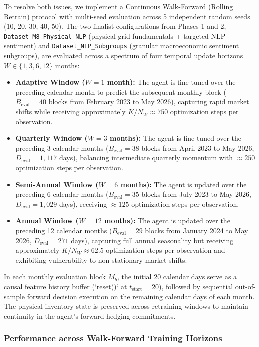To resolve both issues, we implement a Continuous Walk-Forward (Rolling Retrain) protocol with multi-seed evaluation across 5 independent random seeds (10, 20, 30, 40, 50). The two finalist configurations from Phases 1 and 2, \texttt{Dataset\_\allowbreak M8\_\allowbreak Physical\_\allowbreak NLP} (physical grid fundamentals + targeted NLP sentiment) and \texttt{Dataset\_\allowbreak NLP\_\allowbreak Subgroups} (granular macroeconomic sentiment subgroups), are evaluated across a spectrum of four temporal update horizons $W \in \{1, 3, 6, 12\}$ months:
\begin{itemize}
    \item \textbf{Adaptive Window ($W=1$ month):} The agent is fine-tuned over the preceding calendar month to predict the subsequent monthly block ($B_{\text{eval}} = 40$ blocks from February 2023 to May 2026), capturing rapid market shifts while receiving approximately $K/N_W \approx 750$ optimization steps per observation.
    \item \textbf{Quarterly Window ($W=3$ months):} The agent is fine-tuned over the preceding 3 calendar months ($B_{\text{eval}} = 38$ blocks from April 2023 to May 2026, $D_{\text{eval}} = 1{,}117$ days), balancing intermediate quarterly momentum with $\approx 250$ optimization steps per observation.
    \item \textbf{Semi-Annual Window ($W=6$ months):} The agent is updated over the preceding 6 calendar months ($B_{\text{eval}} = 35$ blocks from July 2023 to May 2026, $D_{\text{eval}} = 1{,}029$ days), receiving $\approx 125$ optimization steps per observation.
    \item \textbf{Annual Window ($W=12$ months):} The agent is updated over the preceding 12 calendar months ($B_{\text{eval}} = 29$ blocks from January 2024 to May 2026, $D_{\text{eval}} = 271$ days), capturing full annual seasonality but receiving approximately $K/N_W \approx 62.5$ optimization steps per observation and exhibiting vulnerability to non-stationary market shifts.
\end{itemize}

In each monthly evaluation block $M_b$, the initial 20 calendar days serve as a causal feature history buffer (`reset()` at $t_{\text{start}}=20$), followed by sequential out-of-sample forward decision execution on the remaining calendar days of each month. The physical inventory state is preserved across retraining windows to maintain continuity in the agent's forward hedging commitments.

\subsubsection{Performance across Walk-Forward Training Horizons}

